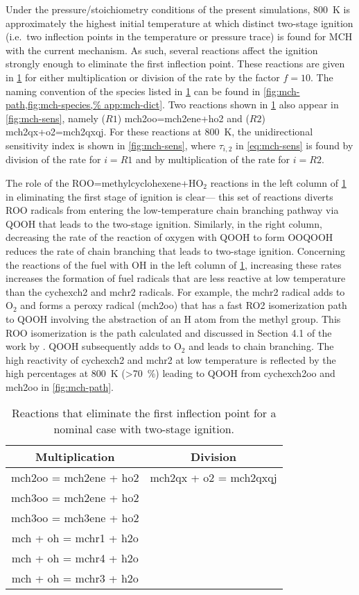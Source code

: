 \documentclass[../main.tex]{subfiles}
\begin{document}
Under the pressure/stoichiometry conditions of the present simulations, \SI{800}{\kelvin}
is approximately the highest initial temperature at which distinct two-stage
ignition (i.e.\ two inflection points in the temperature or pressure trace) is
found for MCH with the current mechanism. As such, several reactions affect
the ignition strongly enough to eliminate the first inflection point. These
reactions are given in \cref{tab:mch-sens} for either multiplication or
division of the rate by the factor $f=10$. The naming convention of the species
listed in \cref{tab:mch-sens} can be found in \cref{fig:mch-path,fig:mch-species,%
app:mch-dict}. Two reactions shown in
\cref{tab:mch-sens} also appear in \cref{fig:mch-sens}, namely ($R1$)
mch2oo=mch2ene+ho2 and ($R2$) mch2qx+o2=mch2qxqj. For these reactions at \SI{800}{\kelvin},
the unidirectional sensitivity index is shown in \cref{fig:mch-sens}, where $\tau_{i,2}$
in \cref{eq:mch-sens} is found by division of the rate for $i=R1$ and by
multiplication of the rate for $i=R2$.

The role of the ROO=methylcyclohexene+HO$_2$ reactions in the left column of
\cref{tab:mch-sens} in eliminating the first stage of ignition is clear---%
this set of reactions diverts ROO radicals from entering the low-temperature
chain branching pathway via QOOH that leads to the two-stage ignition.
Similarly, in the right column, decreasing the rate of the reaction of oxygen
with QOOH to form OOQOOH reduces the rate of chain branching that leads to
two-stage ignition. Concerning the reactions of the fuel with OH in the left
column of \cref{tab:mch-sens}, increasing these rates increases the
formation of fuel radicals that are less reactive at low temperature than the
cychexch2 and mchr2 radicals. For example, the mchr2 radical adds to O$_2$ and
forms a peroxy radical (mch2oo) that has a fast RO2 isomerization path to QOOH
involving the abstraction of an H atom from the methyl group. This ROO
isomerization is the path calculated and discussed in Section 4.1 of the work by
\textcite{Weber2014}. QOOH subsequently adds to O$_2$ and leads to chain branching.
The high reactivity of cychexch2 and mchr2 at low temperature is reflected by
the high percentages at \SI{800}{\kelvin} (>\SI{70}{\percent}) leading to QOOH from cychexch2oo and
mch2oo in \cref{fig:mch-path}.

\begin{table}
    \caption{Reactions that eliminate the first inflection point for a nominal
    case with two-stage ignition.}
    \label{tab:mch-sens}
    \begin{tabular}{c c}
    \toprule
    Multiplication & Division \\
    \midrule
    mch2oo = mch2ene + ho2 & mch2qx + o2 = mch2qxqj \\
    mch3oo = mch2ene + ho2 & \\
    mch3oo = mch3ene + ho2 & \\
    mch + oh = mchr1 + h2o & \\
    mch + oh = mchr4 + h2o & \\
    mch + oh = mchr3 + h2o & \\
    \bottomrule
    \end{tabular}
\end{table}
\end{document}
